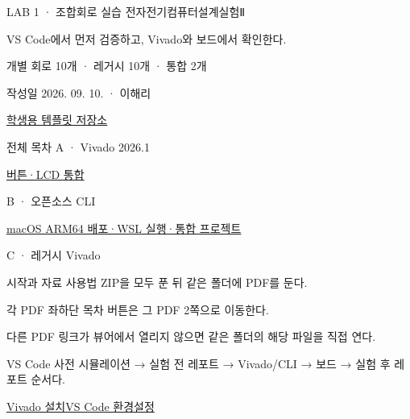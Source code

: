 
\renewcommand{\labonehome}{\hyperlink{lab1-contents}{\contentsbutton}}
\renewcommand{\legacySource}[1]{}
\providecommand{\terminalbox}[1]{\par\vspace{0.15cm}{\setlength{\fboxsep}{7pt}\colorbox{black}{\parbox{\dimexpr\textwidth-14pt\relax}{\color{white}\ttfamily\fontsize{7}{9}\selectfont #1}}}\par\vspace{0.15cm}}

\begingroup
\renewcommand{\small}{\fontsize{9}{11}\selectfont}
\begin{frame}{LAB 1 · 조합회로 실습}\relax
\small
전자전기컴퓨터설계실험Ⅱ\par\vspace{0.22cm}VS Code에서 먼저 검증하고, Vivado와 보드에서 확인한다.\par\vspace{0.22cm}개별 회로 10개 · 레거시 10개 · 통합 2개\par\vspace{0.22cm}작성일 2026. 09. 10. · 이해리\par\href{https://github.com/Glaysia/fpga-lab-template}{학생용 템플릿 저장소}
\end{frame}

\begin{frame}[label=lab1-contents]{전체 목차}\relax
\small
A · Vivado 2026.1\par{}\quad\href{04.LAB1_10A_INTEGRATED_VIVADO.pdf}{버튼·LCD 통합}\par\vspace{0.45cm}
B · 오픈소스 CLI\par\href{04.LAB1_10B_INTEGRATED_CLI.pdf}{macOS ARM64 배포·WSL 실행·통합 프로젝트}\par\vspace{0.45cm}
C · 레거시 Vivado\par{}\par\vspace{0.45cm}
\quad{}
\end{frame}

\begin{frame}[label=lab1-start]{시작과 자료 사용법}\relax
\small
ZIP을 모두 푼 뒤 같은 폴더에 PDF를 둔다.\par\vspace{0.22cm}각 PDF 좌하단 목차 버튼은 그 PDF 2쪽으로 이동한다.\par\vspace{0.22cm}다른 PDF 링크가 뷰어에서 열리지 않으면 같은 폴더의 해당 파일을 직접 연다.\par\vspace{0.22cm}VS Code 사전 시뮬레이션 → 실험 전 레포트 → Vivado/CLI → 보드 → 실험 후 레포트 순서다.\par\href{01.vivado_2026_1_설치_매뉴얼.pdf}{Vivado 설치}\quad\href{02.vscode_verilog_환경설정_매뉴얼.pdf}{VS Code 환경설정}
\end{frame}

